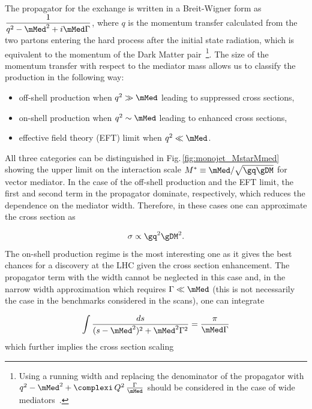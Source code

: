 The propagator for the \schannel exchange is written in a Breit-Wigner
form as $\displaystyle \frac{1}{q^2-\mMed^2 + i\mMed\Gamma}$, where $q$ is the momentum transfer calculated from the two partons entering the hard process after the initial state radiation, which is equivalent to the momentum of the Dark Matter pair~\footnote{Using a running width and replacing the denominator of the propagator with $q^2 - \mMed^2 + \complexi\,Q^2\,\frac{\Gamma}{\mMed}$ should be considered in the case of wide mediators~\cite{Bardin:1989qr}.}. %
The size of the momentum transfer with respect to the mediator mass allows us to classify the production in the following way:
\begin{itemize}
	\item off-shell production when $q^2 \gg \mMed$ leading to suppressed cross sections,
	\item on-shell production when $q^2 \sim \mMed$ leading to enhanced cross sections,
	\item effective field theory (EFT) limit when $q^2 \ll \mMed$.
\end{itemize}
All three categories can be distinguished in Fig.\,\ref{fig:monojet_MstarMmed} showing the upper limit on the interaction scale $M^{*} \equiv \mMed/\sqrt{\gq\gDM}$ for vector mediator. 
In the case of the off-shell production and the EFT limit, the first and second term in the propagator dominate, respectively, which reduces the dependence on the mediator width. Therefore, in these cases one can approximate the cross section as

\begin{equation}
\sigma \propto \gq^2\gDM^2.
\end{equation}
The on-shell production regime is the most interesting one as it gives the best chances for a discovery at the LHC given the cross section enhancement. The propagator term with the width cannot be neglected in this case and, in the narrow width approximation which requires $\Gamma \ll \mMed$ (this is not necessarily the case in the benchmarks considered in the scans), one can integrate

\begin{equation}
\int \frac{ds}{(s-\mMed^2)^2 + \mMed^2\Gamma^2} = \frac{\pi}{\mMed\Gamma}
\label{eq:monojet_int}
\end{equation}
which further implies the cross section scaling

